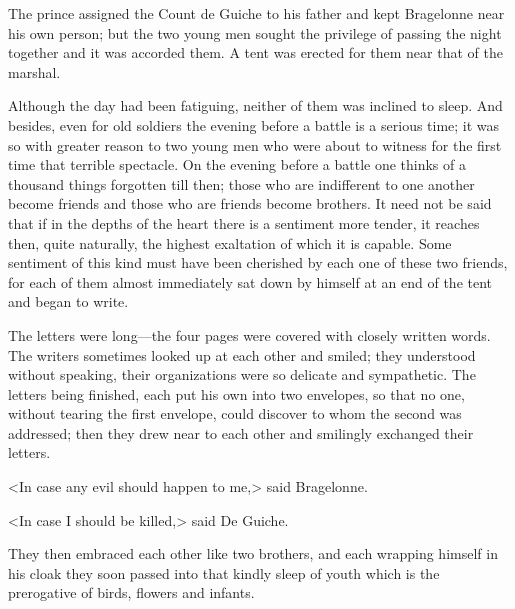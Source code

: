 The prince assigned the Count de Guiche to his father and kept Bragelonne near his own person; but the two young men sought the privilege of passing the night together and it was accorded them. A tent was erected for them near that of the marshal.

Although the day had been fatiguing, neither of them was inclined to sleep. And besides, even for old soldiers the evening before a battle is a serious time; it was so with greater reason to two young men who were about to witness for the first time that terrible spectacle. On the evening before a battle one thinks of a thousand things forgotten till then; those who are indifferent to one another become friends and those who are friends become brothers. It need not be said that if in the depths of the heart there is a sentiment more tender, it reaches then, quite naturally, the highest exaltation of which it is capable. Some sentiment of this kind must have been cherished by each one of these two friends, for each of them almost immediately sat down by himself at an end of the tent and began to write.

The letters were long—the four pages were covered with closely written words. The writers sometimes looked up at each other and smiled; they understood without speaking, their organizations were so delicate and sympathetic. The letters being finished, each put his own into two envelopes, so that no one, without tearing the first envelope, could discover to whom the second was addressed; then they drew near to each other and smilingly exchanged their letters.

<In case any evil should happen to me,> said Bragelonne.

<In case I should be killed,> said De Guiche.

They then embraced each other like two brothers, and each wrapping himself in his cloak they soon passed into that kindly sleep of youth which is the prerogative of birds, flowers and infants. 